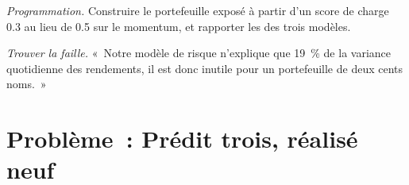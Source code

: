 \begin{exercise}[$\star\star\star$]\label{exo:rs:risk-models:7}
\emph{Programmation.} Construire le portefeuille exposé à partir d'un score de charge 0.3 au lieu de 0.5 sur le momentum, et rapporter les  des trois modèles.
\end{exercise}

\begin{exercise}[$\star\star\star$]\label{exo:rs:risk-models:8}
\emph{Trouver la faille.} «~Notre modèle de risque n'explique que 19~\% de la variance quotidienne des rendements, il est donc inutile pour un portefeuille de deux cents noms.~»
\end{exercise}

\section{Problème~: Prédit trois, réalisé neuf}

